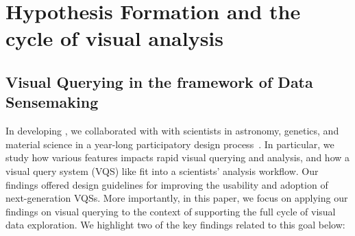 \section{Hypothesis Formation and the cycle of visual analysis\label{sec:hypothesis}}
\subsection{Visual Querying in the framework of Data Sensemaking}
In developing \zv, we collaborated with with scientists in astronomy, genetics, and material science in a year-long participatory design process~\cite{Lee2017}. In particular, we study how various features impacts rapid visual querying and analysis, and how a visual query system (VQS) like \zv fit into a scientists’ analysis workflow. Our findings offered design guidelines for improving the usability and adoption of next-generation VQSs. More importantly, in this paper, we focus on applying our findings on visual querying to the context of supporting the full cycle of visual data exploration. We highlight two of the key findings related to this goal below: 

